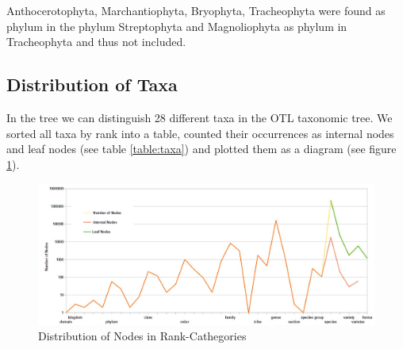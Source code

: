       Anthocerotophyta, Marchantiophyta, Bryophyta, Tracheophyta were found as phylum in the phylum 
        Streptophyta and Magnoliophyta as phylum in Tracheophyta and thus not included.

    \subsection{Distribution of Taxa}
      In the tree we can distinguish 28 different taxa in the OTL taxonomic tree. We sorted all taxa by
        rank into a table, counted their occurrences as internal nodes and leaf nodes (see table 
        \ref{table:taxa}) and plotted them as a diagram (see figure \ref{fig:taxa}).
    \begin{figure}[h!]
      \centering
      \includegraphics[width=\textwidth]{Figures/TaxaTable2.JPG}
      \caption{Distribution of Nodes in Rank-Cathegories}
      \label{fig:taxa}
    \end{figure}

